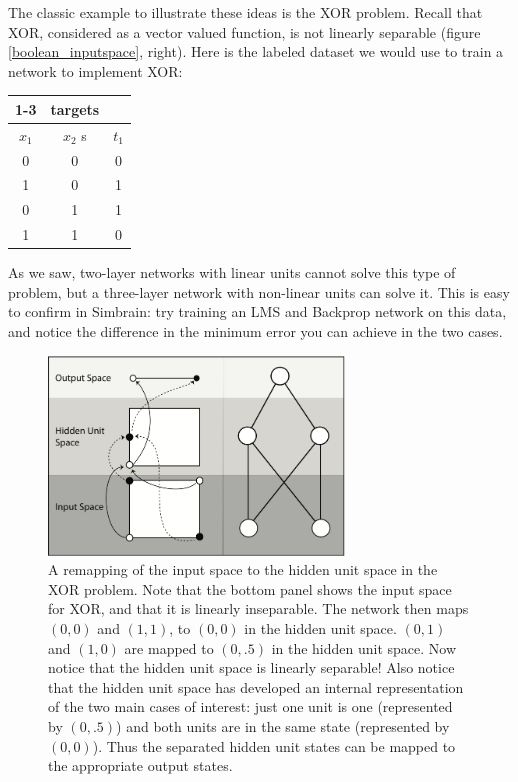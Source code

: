 The classic example to illustrate these ideas is the XOR problem. Recall that XOR, considered as a vector valued function, is not linearly separable (figure \ref{boolean_inputspace}, right). Here is the labeled dataset we would use to train a network to implement XOR:
\begin{center}
\begin{tabular}{| c | c || c | }
\cline{1-3}
\multicolumn{2}{| c || }{inputs}
 & \multicolumn{1}{c|}{targets} \\
\hline
  $x_1$  & $x_2$ s& $t_1$  \\
\hline
  0 & 0 & 0  \\
\hline
 1 & 0 & 1  \\
\hline
 0 & 1 & 1 \\
\hline
1 & 1 & 0 \\
\hline
\end{tabular}
\end{center}
As we saw, two-layer networks with linear units cannot solve this type of problem, but a three-layer network with non-linear units can solve it. This is easy to confirm in Simbrain: try training an LMS and Backprop network on this data, and notice the difference in the minimum error you can achieve in the two cases. %
	
\begin{figure}[h]
\centering
\includegraphics[width=0.7\textwidth]{images/xor_internal_rep.png}
\caption[Pamela Payne.]{A remapping of the input space to the hidden unit space in the XOR problem. Note that the bottom panel shows the input space for XOR, and that it is linearly inseparable. The network then maps $(0,0)$ and $(1,1)$,  to $(0,0)$ in the hidden unit space. $(0,1)$ and $(1,0)$ are mapped to $(0,.5)$ in the hidden unit space. Now notice that the hidden unit space is linearly separable!  Also notice that the hidden unit space has developed an internal representation of the two main cases of interest: just one unit is one (represented by $(0,.5)$) and both units are in the same state (represented by $(0,0)$). Thus the separated hidden unit states can be mapped to the appropriate output states.}
\label{xor_remapping}
\end{figure}


